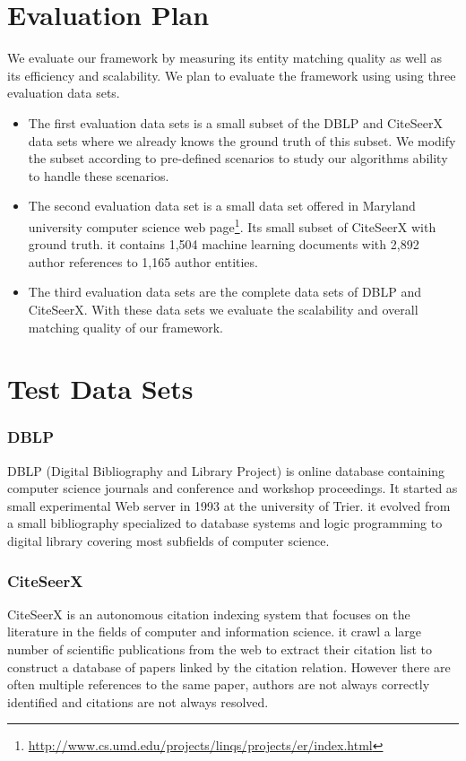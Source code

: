 \section{Evaluation Plan} 
We evaluate our framework by measuring its entity matching quality as well as its efficiency and scalability. We plan to evaluate the framework using using three evaluation data sets. 
\begin{itemize}

\item The first evaluation data sets is a small subset of the DBLP and CiteSeerX data sets where we already knows the ground truth of this subset. We modify the subset according to pre-defined scenarios to study our algorithms ability to handle these scenarios. 

\item The second evaluation data set is a small data set offered in Maryland university computer science web page\footnote{\url{http://www.cs.umd.edu/projects/linqs/projects/er/index.html}}. Its small subset of CiteSeerX with ground truth. it contains 1,504 machine learning documents with 2,892 author references to 1,165 author entities.

\item The third evaluation data sets are the complete data sets of DBLP and CiteSeerX. With these data sets we evaluate the scalability and overall matching quality of our framework.
\end{itemize}
\section{Test Data Sets}
\subsubsection{DBLP}

DBLP (Digital Bibliography and Library Project) is online database containing computer science journals and conference and workshop proceedings. It started as small experimental Web server in 1993 at the university of Trier. it evolved from a small bibliography specialized to database systems and logic programming to digital library covering most subfields of computer science.

\subsubsection{CiteSeerX}
CiteSeerX is an autonomous citation indexing system that focuses on the literature in the fields of computer and information science. it crawl a large number of scientific publications from the web to extract their citation list to construct a database of papers linked by the citation relation. However there are often multiple references to the same paper, authors are not always correctly identified and citations are not always resolved. 